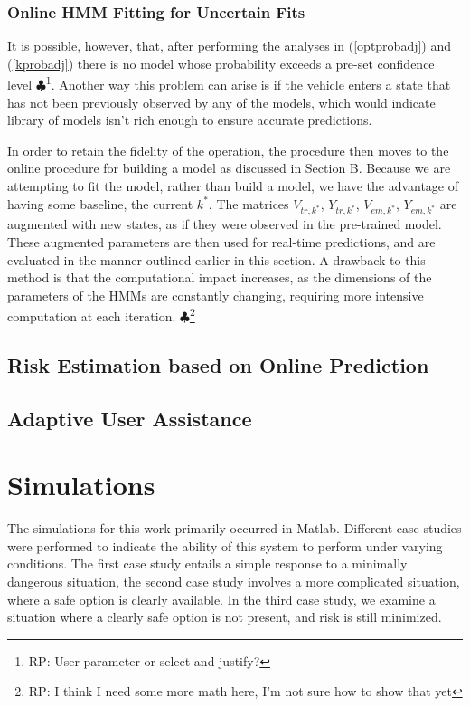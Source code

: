 \documentclass[conference]{IEEEtran}
\newcommand\RP[1]{$\clubsuit$\footnote{RP: #1}}
\begin{document}
\subsubsection{Online HMM Fitting for Uncertain Fits}
It is possible, however, that, after performing the analyses in (\ref{optprobadj}) and (\ref{kprobadj}) there is no model whose probability exceeds a pre-set confidence level \RP{User parameter or select and justify?}. Another way this problem can arise is if the vehicle enters a state that has not been previously observed by any of the models, which would indicate library of models isn't rich enough to ensure accurate predictions.

In order to retain the fidelity of the operation, the procedure then moves to the online procedure for building a model as discussed in Section B. Because we are attempting to fit the model, rather than build a model, we have the advantage of having some baseline, the current $k^{*}$. The matrices $V_{tr,k^{*}}$, $Y_{tr,k^{*}}$, $V_{em,k^{*}}$, $Y_{em,k^{*}}$ are augmented with new states, as if they were observed in the pre-trained model. These augmented parameters are then used for real-time predictions, and are evaluated in the manner outlined earlier in this section. A drawback to this method is that the computational impact increases, as the dimensions of the parameters of the HMMs are constantly changing, requiring more intensive computation at each iteration. \RP{I think I need some more math here, I'm not sure how to show that yet}


\subsection{Risk Estimation based on Online Prediction}



\subsection{Adaptive User Assistance}


 
 
 
	



\section{Simulations}
The simulations for this work primarily occurred in Matlab. Different case-studies were performed to indicate the ability of this system to perform under varying conditions. The first case study entails a simple response to a minimally dangerous situation, the second case study involves a more complicated situation, where a safe option is clearly available. In the third case study, we examine a situation where a clearly safe option is not present, and risk is still minimized.
\end{document}
